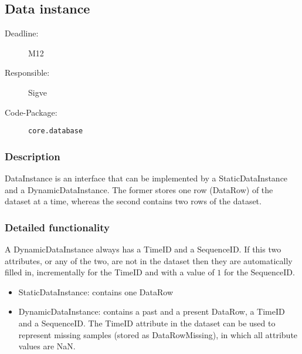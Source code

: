 \subsection{Data instance}
\label{DataInstance:ID}

\begin{description}
\item[Deadline:] M12
\item[Responsible:] Sigve
\item[Code-Package:] \texttt{core.database}
\end{description}

\subsubsection*{Description}

DataInstance is an interface that can be implemented by a StaticDataInstance and a DynamicDataInstance. The former stores one row (DataRow) of the dataset at a time, whereas the second contains two rows of the dataset. 

\subsubsection*{Detailed functionality}

A DynamicDataInstance always has a TimeID and a SequenceID. If this two attributes, or any of the two, are not in the dataset then they are automatically filled in, incrementally for the TimeID and with a value of $1$ for the SequenceID.

\begin{itemize}
\item StaticDataInstance: contains one DataRow
\item DynamicDataInstance: contains a past and a present DataRow, a TimeID and a SequenceID. The TimeID attribute in the dataset can be used to represent missing samples (stored as DataRowMissing), in which all attribute values are NaN.
\end{itemize}


